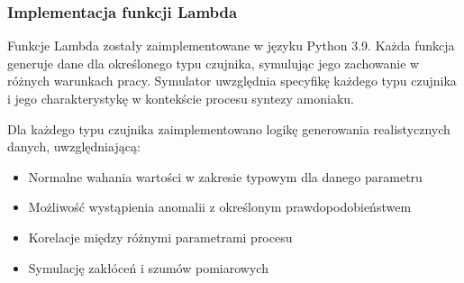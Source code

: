 %

\subsubsection{Implementacja funkcji Lambda}
\label{subsubsec:implementacja_lambda}

Funkcje Lambda zostały zaimplementowane w języku Python 3.9. Każda funkcja generuje dane dla określonego typu czujnika,
symulując jego zachowanie w różnych warunkach pracy. Symulator uwzględnia specyfikę każdego typu czujnika i jego charakterystykę w kontekście procesu syntezy amoniaku.

Dla każdego typu czujnika zaimplementowano logikę generowania realistycznych danych, uwzględniającą:
\begin{itemize}
    \item Normalne wahania wartości w zakresie typowym dla danego parametru
    \item Możliwość wystąpienia anomalii z określonym prawdopodobieństwem
    \item Korelacje między różnymi parametrami procesu
    \item Symulację zakłóceń i szumów pomiarowych
\end{itemize}
